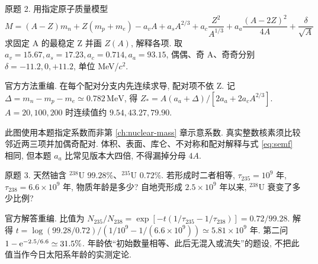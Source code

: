 \begin{exercise}\label{ex:8701-5-2}
原题 2. 用指定原子质量模型
\begin{equation*}
 M=(A-Z)m_n+Z(m_p+m_e)-a_vA+a_sA^{2/3}+a_c\frac{Z^2}{A^{1/3}}+a_a\frac{(A-2Z)^2}{4A}+\frac\delta{\sqrt A}
\end{equation*}
求固定 A 的最稳定 Z 并画 $Z(A)$, 解释各项. 取 $a_v=15.67,a_s=17.23,a_c=0.714,a_a=93.15$, 偶偶、奇 A、奇奇分别 $\delta=-11.2,0,+11.2$, 单位 MeV/$c^2$.
\end{exercise}
\begin{solution}
官方方法重编. 在每个配对分支内先连续求导, 配对项不依 Z. 记 $\Delta=m_n-m_p-m_e\simeq0.782\,\mathrm{MeV}$, 得
$Z_*=A(a_a+\Delta)/[2a_a+2a_cA^{2/3}]$.
$A=20,100,200$ 时连续值约 $9.54,43.27,79.90$. \begin{center}\end{center}
此图使用本题指定系数而非第 \ref{ch:nuclear-mass} 章示意系数. 真实整数核素须比较邻近两三项并加偶奇配对. 体积、表面、库仑、不对称和配对解释与式 \eqref{eq:semf} 相同, 但本题 $a_a$ 比常见版本大四倍, 不得漏掉分母 $4A$.
\end{solution}
\begin{exercise}\label{ex:8701-5-3}
原题 3. 天然铀含 $^{238}$U $99.28\%$、$^{235}$U $0.72\%$. 若形成时二者相等, $\tau_{235}=10^9$ 年, $\tau_{238}=6.6\times10^9$ 年, 物质年龄是多少? 自地壳形成 $2.5\times10^9$ 年以来, $^{238}$U 衰变了多少比例?
\end{exercise}
\begin{solution}
官方解答重编. 比值为 $N_{235}/N_{238}=\exp[-t(1/\tau_{235}-1/\tau_{238})]=0.72/99.28$. 解得 $t=\log(99.28/0.72)/(1/10^9-1/(6.6\times10^9))\simeq5.81\times10^9$ 年. 第二问 $1-\mathrm e^{-2.5/6.6}\simeq31.5\%$. 年龄依``初始数量相等、此后无混入或流失''的题设, 不把此值当作今日太阳系年龄的实测定论.
\end{solution}
